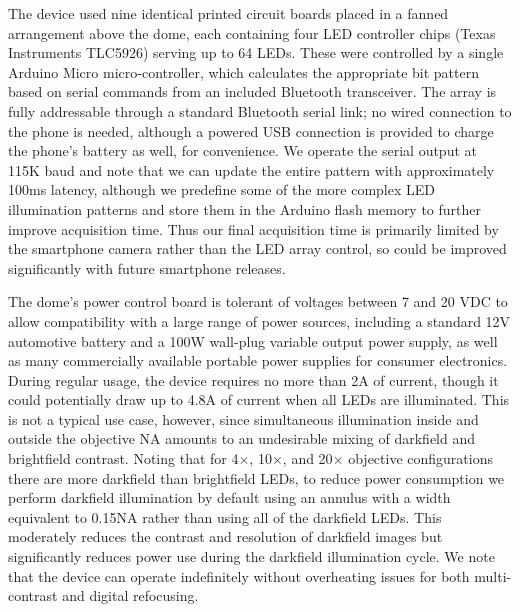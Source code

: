 The device used nine identical printed circuit boards placed in a fanned arrangement above the dome, each containing four LED controller chips (Texas Instruments TLC5926) serving up to 64 LEDs. These were controlled by a single Arduino Micro micro-controller, which calculates the appropriate bit pattern based on serial commands from an included Bluetooth transceiver. The array is fully addressable through a standard Bluetooth serial link; no wired connection to the phone is needed, although a powered USB connection is provided to charge the phone’s battery as well, for convenience. We operate the serial output at 115K baud and note that we can update the entire pattern with approximately 100ms latency, although we predefine some of the more complex LED illumination patterns and store them in the Arduino flash memory to further improve acquisition time. Thus our final acquisition time is primarily limited by the smartphone camera rather than the LED array control, so could be improved significantly with future smartphone releases.

The dome's power control board is tolerant of voltages between 7 and 20 VDC to allow compatibility with a large range of power sources, including a standard 12V automotive battery and a 100W wall-plug variable output power supply, as well as many commercially available portable power supplies for consumer electronics. During regular usage, the device requires no more than 2A of current, though it could potentially draw up to 4.8A of current when all LEDs are illuminated. This is not a typical use case, however, since simultaneous illumination inside and outside the objective NA amounts to an undesirable mixing of darkfield and brightfield contrast. Noting that for 4$\times$, 10$\times$, and 20$\times$ objective configurations there are more darkfield than brightfield LEDs, to reduce power consumption we perform darkfield illumination by default using an annulus with a width equivalent to 0.15NA rather than using all of the darkfield LEDs. This moderately reduces the contrast and resolution of darkfield images but significantly reduces power use during the darkfield illumination cycle. We note that the device can operate indefinitely without overheating issues for both multi-contrast and digital refocusing.

